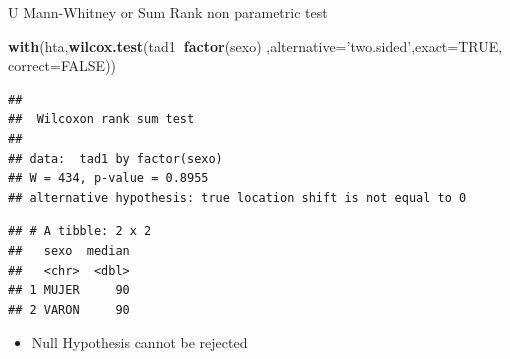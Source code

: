 \documentclass[
  ignorenonframetext,
]{beamer}
\newenvironment{Shaded}{\begin{snugshade}}{\end{snugshade}}
\newcommand{\DataTypeTok}[1]{\textcolor[rgb]{0.13,0.29,0.53}{#1}}
\newcommand{\KeywordTok}[1]{\textcolor[rgb]{0.13,0.29,0.53}{\textbf{#1}}}
\newcommand{\NormalTok}[1]{#1}
\newcommand{\OperatorTok}[1]{\textcolor[rgb]{0.81,0.36,0.00}{\textbf{#1}}}
\newcommand{\OtherTok}[1]{\textcolor[rgb]{0.56,0.35,0.01}{#1}}
\newcommand{\StringTok}[1]{\textcolor[rgb]{0.31,0.60,0.02}{#1}}
\providecommand{\tightlist}{%
  \setlength{\itemsep}{0pt}\setlength{\parskip}{0pt}}
\begin{document}
\begin{frame}[fragile]{U Mann-Whitney or Sum Rank non parametric test}
\protect\hypertarget{u-mann-whitney-or-sum-rank-non-parametric-test}{}

\small

\begin{Shaded}
\begin{Highlighting}[]
\KeywordTok{with}\NormalTok{(hta,}\KeywordTok{wilcox.test}\NormalTok{(tad1}\OperatorTok{~}\KeywordTok{factor}\NormalTok{(sexo)}
\NormalTok{    ,}\DataTypeTok{alternative=}\StringTok{'two.sided'}\NormalTok{,}\DataTypeTok{exact=}\OtherTok{TRUE}\NormalTok{, }\DataTypeTok{correct=}\OtherTok{FALSE}\NormalTok{))}
\end{Highlighting}
\end{Shaded}

\begin{verbatim}
## 
##  Wilcoxon rank sum test
## 
## data:  tad1 by factor(sexo)
## W = 434, p-value = 0.8955
## alternative hypothesis: true location shift is not equal to 0
\end{verbatim}

\begin{Shaded}
\end{Shaded}

\begin{verbatim}
## # A tibble: 2 x 2
##   sexo  median
##   <chr>  <dbl>
## 1 MUJER     90
## 2 VARON     90
\end{verbatim}

\begin{itemize}
\tightlist
\item
  Null Hypothesis cannot be rejected
\end{itemize}

\end{frame}
\end{document}
